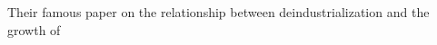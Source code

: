 \documentclass[a4paper]{article}
\begin{document}
\parbox{9.0em}{\setlength{\parfillskip}{0pt}%
  Their famous paper on the relationship
  between \snakequad
  deindustrialization and the growth of
}
\end{document}

